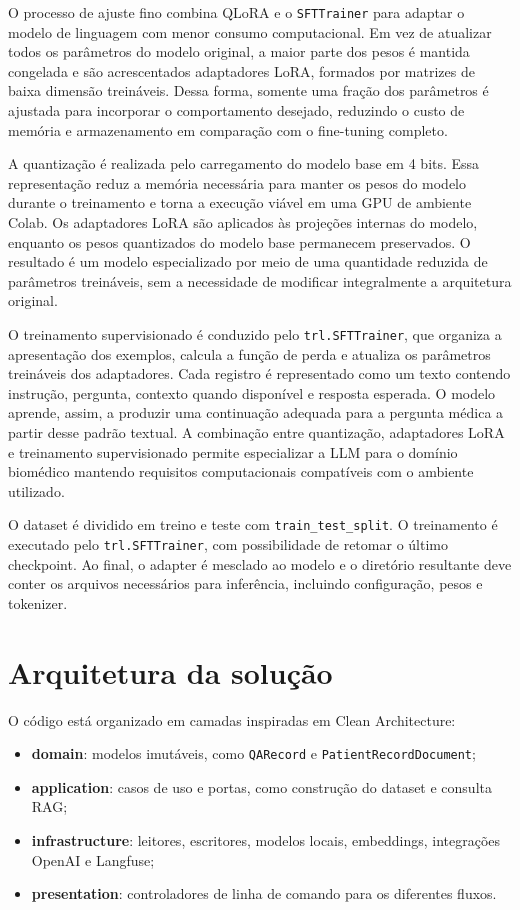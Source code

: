 \documentclass[12pt,a4paper]{article}
\begin{document}
O processo de ajuste fino combina QLoRA e o \texttt{SFTTrainer} para adaptar o modelo de linguagem com menor consumo computacional. Em vez de atualizar todos os parâmetros do modelo original, a maior parte dos pesos é mantida congelada e são acrescentados adaptadores LoRA, formados por matrizes de baixa dimensão treináveis. Dessa forma, somente uma fração dos parâmetros é ajustada para incorporar o comportamento desejado, reduzindo o custo de memória e armazenamento em comparação com o fine-tuning completo.

A quantização é realizada pelo carregamento do modelo base em 4 bits. Essa representação reduz a memória necessária para manter os pesos do modelo durante o treinamento e torna a execução viável em uma GPU de ambiente Colab. Os adaptadores LoRA são aplicados às projeções internas do modelo, enquanto os pesos quantizados do modelo base permanecem preservados. O resultado é um modelo especializado por meio de uma quantidade reduzida de parâmetros treináveis, sem a necessidade de modificar integralmente a arquitetura original.

O treinamento supervisionado é conduzido pelo \texttt{trl.SFTTrainer}, que organiza a apresentação dos exemplos, calcula a função de perda e atualiza os parâmetros treináveis dos adaptadores. Cada registro é representado como um texto contendo instrução, pergunta, contexto quando disponível e resposta esperada. O modelo aprende, assim, a produzir uma continuação adequada para a pergunta médica a partir desse padrão textual. A combinação entre quantização, adaptadores LoRA e treinamento supervisionado permite especializar a LLM para o domínio biomédico mantendo requisitos computacionais compatíveis com o ambiente utilizado.

O dataset é dividido em treino e teste com \texttt{train\_test\_split}. O treinamento é executado pelo \texttt{trl.SFTTrainer}, com possibilidade de retomar o último checkpoint. Ao final, o adapter é mesclado ao modelo e o diretório resultante deve conter os arquivos necessários para inferência, incluindo configuração, pesos e tokenizer.

\section{Arquitetura da solução}

O código está organizado em camadas inspiradas em Clean Architecture:
\begin{itemize}
  \item \textbf{domain}: modelos imutáveis, como \texttt{QARecord} e \texttt{PatientRecordDocument};
  \item \textbf{application}: casos de uso e portas, como construção do dataset e consulta RAG;
  \item \textbf{infrastructure}: leitores, escritores, modelos locais, embeddings, integrações OpenAI e Langfuse;
  \item \textbf{presentation}: controladores de linha de comando para os diferentes fluxos.
\end{itemize}
\end{document}
